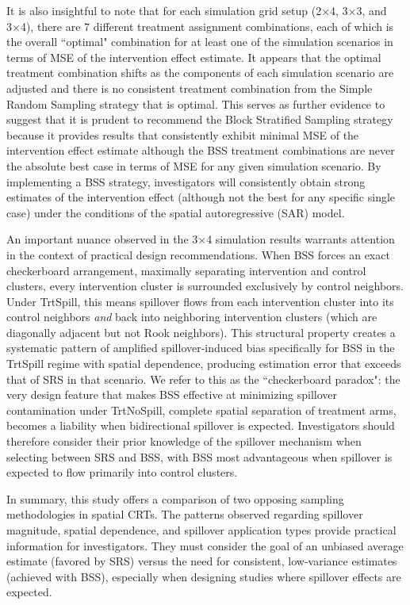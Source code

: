 \documentclass{article}[11pt]
\begin{document}
It is also insightful to note that for each simulation grid setup (2×4, 3×3, and 3×4), there are 7 different treatment assignment combinations, each of which is the overall ``optimal" combination for at least one of the simulation scenarios in terms of MSE of the intervention effect estimate. It appears that the optimal treatment combination shifts as the components of each simulation scenario are adjusted and there is no consistent treatment combination from the Simple Random Sampling strategy that is optimal. This serves as further evidence to suggest that it is prudent to recommend the Block Stratified Sampling strategy because it provides results that consistently exhibit minimal MSE of the intervention effect estimate although the BSS treatment combinations are never the absolute best case in terms of MSE for any given simulation scenario. By implementing a BSS strategy, investigators will consistently obtain strong estimates of the intervention effect (although not the best for any specific single case) under the conditions of the spatial autoregressive (SAR) model.

An important nuance observed in the 3$\times$4 simulation results warrants attention in the context of practical design recommendations. When BSS forces an exact checkerboard arrangement, maximally separating intervention and control clusters, every intervention cluster is surrounded exclusively by control neighbors. Under TrtSpill, this means spillover flows from each intervention cluster into its control neighbors \emph{and} back into neighboring intervention clusters (which are diagonally adjacent but not Rook neighbors). This structural property creates a systematic pattern of amplified spillover-induced bias specifically for BSS in the TrtSpill regime with spatial dependence, producing estimation error that exceeds that of SRS in that scenario. We refer to this as the ``checkerboard paradox": the very design feature that makes BSS effective at minimizing spillover contamination under TrtNoSpill, complete spatial separation of treatment arms, becomes a liability when bidirectional spillover is expected. Investigators should therefore consider their prior knowledge of the spillover mechanism when selecting between SRS and BSS, with BSS most advantageous when spillover is expected to flow primarily into control clusters.

In summary, this study offers a comparison of two opposing sampling methodologies in spatial CRTs. The patterns observed regarding spillover magnitude, spatial dependence, and spillover application types provide practical information for investigators. They must consider the goal of an unbiased average estimate (favored by SRS) versus the need for consistent, low-variance estimates (achieved with BSS), especially when designing studies where spillover effects are expected.
\end{document}
